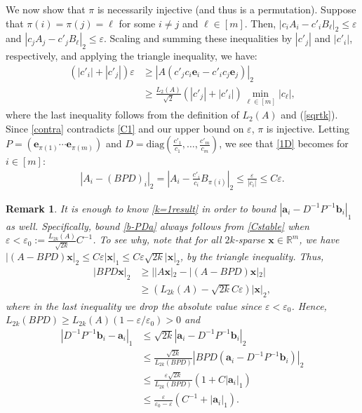 \documentclass[journal, twocolumn]{IEEEtran}
\newtheorem{remark}{Remark}
\begin{document}
We  now show that $\pi$ is necessarily injective (and thus is a permutation). %
Suppose that $\pi(i) = \pi(j) = \ell$ for some $i \neq j$ and $\ell \in [m]$. Then, $|c_iA_i - c'_iB_{\ell}|_2  \leq \varepsilon$ and $|c_jA_j - c'_jB_{\ell}|_2 \leq \varepsilon$. Scaling and summing these inequalities by $|c'_j|$ and $|c'_i|$, respectively, and applying the triangle inequality, we have:
\begin{align}\label{contra}
(|c'_i| + |c'_j|) \varepsilon
&\geq |A(c'_jc_i\mathbf{e}_i - c'_ic_j\mathbf{e}_j)|_2 \nonumber \\ 
&\geq \frac{L_2(A)}{\sqrt{2}} \left( |c'_j| + |c'_i| \right) \min_{\ell \in [m]} |c_\ell |,
\end{align}
%
where the last inequality follows from the definition of $L_2(A)$ and (\ref{sqrtk}). Since \eqref{contra} contradicts \eqref{C1} and our upper bound on $\varepsilon$, $\pi$ is injective. Letting $P = \left( \mathbf{e}_{\pi(1)} \cdots \mathbf{e}_{\pi(m)}\right)$ and $D = \text{diag}(\frac{c'_1}{c_1},\ldots,\frac{c'_m}{c_m})$, we see that \eqref{1D} becomes for $i \in [m]$:
\begin{align}\label{k=1result}
|A_i - (BPD)_i|_2 = |A_i - \frac{c'_i}{c_i}B_{\pi(i)}|_2 \leq \frac{\varepsilon}{|c_i|} \leq C\varepsilon.
\end{align}

\begin{remark}\label{b-PDaProof}
It is enough to know \eqref{k=1result} in order to bound $|\mathbf{a}_i - D^{-1}P^{-1}\mathbf{b}_i|_1$ as well. Specifically, bound \eqref{b-PDa} always follows from \eqref{Cstable} when $\varepsilon < \varepsilon_0 := \frac{L_{2k}(A)}{\sqrt{2k}}C^{-1}$. To see why, note that for all $2k$-sparse $\mathbf{x} \in \mathbb{R}^m$, we have $|(A-BPD)\mathbf{x}|_2 
\leq C\varepsilon|\mathbf{x}|_1
\leq C \varepsilon \sqrt{2k}  |\mathbf{x}|_2$,
by the triangle inequality. Thus,
\begin{align*}
|BPD\mathbf{x}|_2 
&\geq | |A\mathbf{x}|_2 - |(A-BPD)\mathbf{x}|_2 | \\
&\geq (L_{2k}(A) - \sqrt{2k}C\varepsilon ) |\mathbf{x}|_2,
\end{align*}
%
where in the last inequality we drop the absolute value since $\varepsilon < \varepsilon_0$. Hence, $L_{2k}(BPD) \geq L_{2k}(A)\left( 1 - \varepsilon/\varepsilon_0 \right) > 0$ and %
\begin{align*}
|D^{-1}P^{-1}\mathbf{b}_i - \mathbf{a}_i|_1
&\leq \sqrt{2k} |\mathbf{a}_i - D^{-1}P^{-1}\mathbf{b}_i|_2 \\
&\leq \frac{\sqrt{2k}}{L_{2k}(BPD)}|BPD(\mathbf{a}_i - D^{-1}P^{-1}\mathbf{b}_i)|_2 \\
&\leq \frac{\varepsilon\sqrt{2k}}{L_{2k}(BPD)}(1+C|\mathbf{a}_i|_1) \\
&\leq \frac{\varepsilon }{\varepsilon_0 - \varepsilon} \left( C^{-1}+|\mathbf{a}_i|_1 \right).
\end{align*}
\end{remark}
\end{document}

